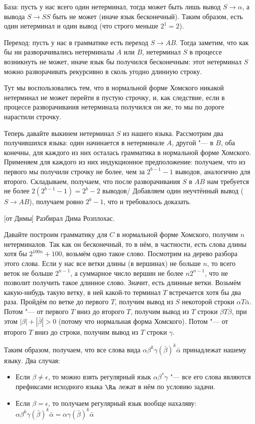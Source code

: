 	База: пусть у нас всего один нетерминал, тогда может быть лишь вывод $S\to \alpha$,
	а вывода $S \to SS$ быть не может (иначе язык бесконечный).
	Таким образом, есть один нетерминал и один вывод (что строго меньше $2^1=2$).

	Переход: пусть у нас в грамматике есть переход $S \to AB$.
	Тогда заметим, что как бы ни разворачивались нетерминалы $A$ или $B$, нетерминал $S$ в процессе возникнуть не может,
	иначе язык бы получился бесконечным: этот нетерминал $S$ можно разворачивать рекурсивно в сколь угодно длинную строку.
	\begin{Rem}
		Тут мы воспользовались тем, что в нормальной форме Хомского никакой нетерминал не может перейти в пустую строчку,
		и, как следствие, если в процессе разворачивания нетерминала получился он же, то мы по дороге нарастили строчку.
	\end{Rem}
	Теперь давайте выкинем нетерминал $S$ из нашего языка.
	Рассмотрим два получившихся языка: один начинается в нетерминале $A$, другой "--- в $B$, оба конечны,
	для каждого из них осталась грамматика в нормальной форме Хомского.
	Применяем для каждого из них индукционное предположение: получаем, что из первого мы получили строчку не более, чем за $2^{b-1}-1$ выводов, аналогично для второго.
	Складываем, получаем, что после разворачивания $S$ в $AB$ нам требуется не более $2(2^{b-1}-1)=2^b-2$ выводов/
	Добавляем один неучтённый вывод ($S \to AB$), получаем ровно $2^b-1$, что и требовалось доказать.

[от Димы]
	Разбирал Дима Розплохас.

	Давайте построим грамматику для $C$ в нормальной форме Хомского, получим $n$ нетерминалов.
	Так как он бесконечный, то в нём, в частности, есть слова длины хотя бы $2^{100n}+100$, возьмём одно такое слово.
	Посмотрим на дерево разбора этого слова.
	Если у нас все ветки длины (в вершинах) не больше $n$, то всего веток не больше $2^{n-1}$, а
	суммарное число вершин не более $n2^{n-1}$, что не позволит получить такое длинное слово.
	Значит, есть длинные ветки.
	Возьмём какую-нибудь такую ветку, в ней какой-то терминал $T$ встречается хотя бы два раза.
	Пройдём по ветке до первого $T$, получим вывод из $S$ некоторой строки $\alpha T \bar\alpha$.
	Потом "--- от первого $T$ вниз до второго $T$, получим вывод из $T$ строки $\beta T \bar\beta$,
	при этом $|\beta| + |\bar\beta| > 0$ (потому что нормальная форма Хомского).
	Потом "--- от второго $T$ вниз до строки, получим вывод из $T$ строки $\gamma$.

	Таким образом, получаем, что все слова вида $\alpha \beta^k \gamma \left(\bar\beta\right)^k \bar\alpha$ принадлежат нашему языку.
	Два случая:
	\begin{itemize}
		\item Если $\beta \neq \epsilon$, то можно взять регулярный язык $\alpha\beta^*\gamma$ "--- все его слова являются префиксами исходного языка $\Ra$ лежат в нём по условию задачи.
		\item Если $\beta = \epsilon$, то получаем регулярный язык вообще нахаляву: $\alpha \beta^k \gamma \left(\bar\beta\right)^k \bar\alpha = \alpha \gamma \left(\bar\beta\right)^k \bar \alpha$
	\end{itemize}


